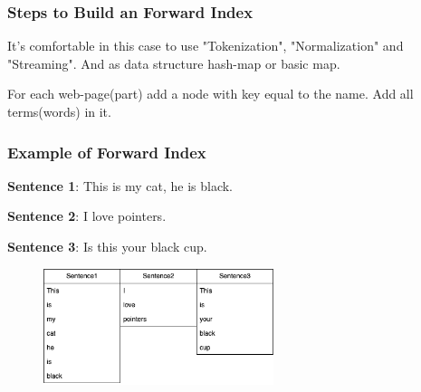 \documentclass[10pt,a4paper]{article}
\begin{document}
\subsubsection{Steps to Build an Forward Index}

It's comfortable in this case to use "Tokenization", "Normalization" and "Streaming". And as data structure hash-map or basic map. 

For each web-page(part) add a node with key equal to the name. Add all terms(words) in it. 

\subsubsection{Example of Forward Index}

\begin{minipage}{0.7\textwidth}
  \textbf{Sentence 1}: This is my cat, he is black.

  \textbf{Sentence 2}: I love pointers.

  \textbf{Sentence 3}: Is this your black cup.
\end{minipage}

\begin{figure}[h]
  \centering
  \captionsetup{labelformat=empty}
  \includegraphics[width=0.6\textwidth]{example2.png}  %
\end{figure}




\end{document}
